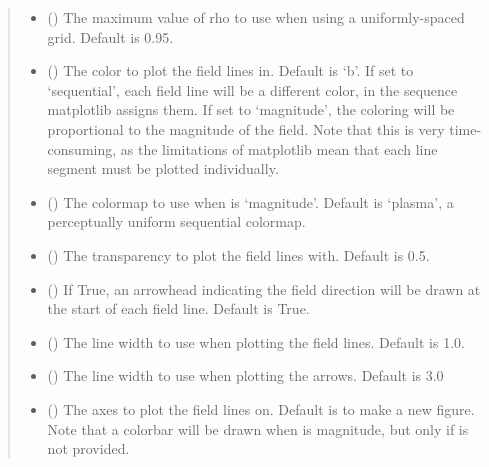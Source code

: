 \documentclass[letterpaper,10pt,english]{sphinxmanual}
\begin{document}
\begin{fulllineitems}
\begin{fulllineitems}
\begin{quote}
\begin{description}
\begin{itemize}
\item {} 
 () \textendash{} The maximum value of rho to use when using a
uniformly-spaced grid. Default is 0.95.

\item {} 
 () \textendash{} The color to plot the field lines in. Default is ‘b’.
If set to ‘sequential’, each field line will be a different
color, in the sequence matplotlib assigns them. If set to
‘magnitude’, the coloring will be proportional to the magnitude
of the field. Note that this is very time-consuming, as the
limitations of matplotlib mean that each line segment must be
plotted individually.

\item {} 
 () \textendash{} The colormap to use when  is ‘magnitude’. Default
is ‘plasma’, a perceptually uniform sequential colormap.

\item {} 
 () \textendash{} The transparency to plot the field lines with.
Default is 0.5.

\item {} 
 () \textendash{} If True, an arrowhead indicating the field direction
will be drawn at the start of each field line. Default is True.

\item {} 
 () \textendash{} The line width to use when plotting the field
lines. Default is 1.0.

\item {} 
 () \textendash{} The line width to use when plotting the
arrows. Default is 3.0

\item {} 
 () \textendash{} The axes to
plot the field lines on. Default is to make a new figure. Note
that a colorbar will be drawn when  is magnitude, but
only if  is not provided.


\end{itemize}
\end{description}
\end{quote}
\end{fulllineitems}
\end{fulllineitems}
\end{document}
